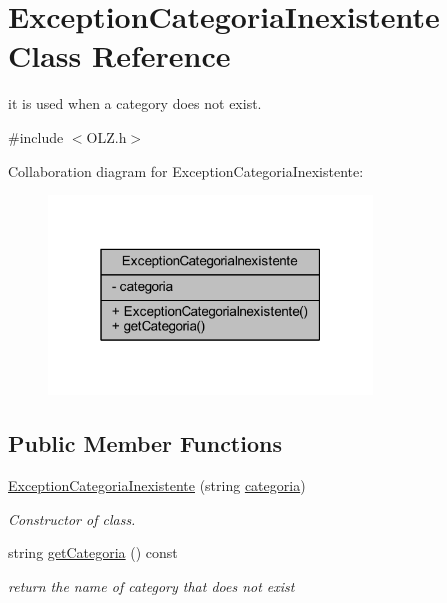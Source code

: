 \hypertarget{class_exception_categoria_inexistente}{}\section{Exception\+Categoria\+Inexistente Class Reference}
\label{class_exception_categoria_inexistente}


it is used when a category does not exist.  




{\ttfamily \#include $<$O\+L\+Z.\+h$>$}



Collaboration diagram for Exception\+Categoria\+Inexistente\+:\nopagebreak
\begin{figure}[H]
\begin{center}
\leavevmode
\includegraphics[width=244pt]{class_exception_categoria_inexistente__coll__graph}
\end{center}
\end{figure}
\subsection*{Public Member Functions}
\begin{DoxyCompactItemize}
\item 
\hyperlink{class_exception_categoria_inexistente_a22baa29851a1ceea7cb7a37ddf248e13}{Exception\+Categoria\+Inexistente} (string \hyperlink{class_exception_categoria_inexistente_a773544fa6e7c45544876d94b2f935a0e}{categoria})
\begin{DoxyCompactList}\small\item\em Constructor of class. \end{DoxyCompactList}\item 
string \hyperlink{class_exception_categoria_inexistente_a37cdb7cfdf36589778e39761bdbb87de}{get\+Categoria} () const 
\begin{DoxyCompactList}\small\item\em return the name of category that does not exist \end{DoxyCompactList}\end{DoxyCompactItemize}
